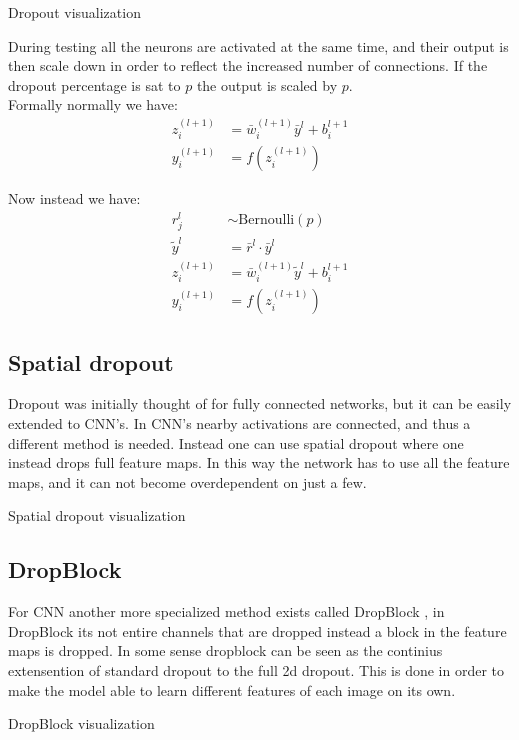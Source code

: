 \begin{marginfigure}
\caption{Dropout visualization}
\label{fig.dropout}
\end{marginfigure} 

During testing all the neurons are activated at the same time, and their output is then scale down in order to reflect the increased number of connections. If the dropout percentage is sat to $p$ the output is scaled by $p$.\\

Formally normally we have:
\begin{align}
z_i^{(l+1)} &= \bar{w}_i^{(l+1)}\bar{y}^l + b_i^{l+1}\\
y_i^{(l+1)} &= f(z_i^{(l+1)})
\end{align}

Now instead we have:
\begin{align}
r_j^l &\sim \text{Bernoulli}(p)\\
\tilde{y}^l &=\bar{r}^l \cdot \bar{y}^l \\
z_i^{(l+1)} &= \bar{w}_i^{(l+1)}\tilde{y}^l + b_i^{l+1}\\
y_i^{(l+1)} &= f(z_i^{(l+1)})
\end{align}

\subsection{Spatial dropout}
Dropout was initially thought of for fully connected networks, but it can be easily extended to CNN's. In CNN's nearby activations are connected, and thus a different method is needed.
Instead one can use spatial dropout\cite{tompsonEfficientObjectLocalization2015} where one instead drops full feature maps. In this way the network has to use all the feature maps, and it can not become overdependent on just a few.\\
\begin{marginfigure}
\caption{Spatial dropout visualization}
\label{fig.dropout2d}
\end{marginfigure} 

\subsection{DropBlock}
For CNN another more specialized method exists called DropBlock \cite{ghiasiDropBlockRegularizationMethod}, in DropBlock its not entire channels that are dropped instead a block in the feature maps is dropped. In some sense dropblock can be seen as the continius extensention of standard dropout to the full 2d dropout. This is done in order to make the model able to learn different features of each image on its own. 
\begin{marginfigure}
\caption{DropBlock visualization}
\label{fig.dropblock}
\end{marginfigure} 

